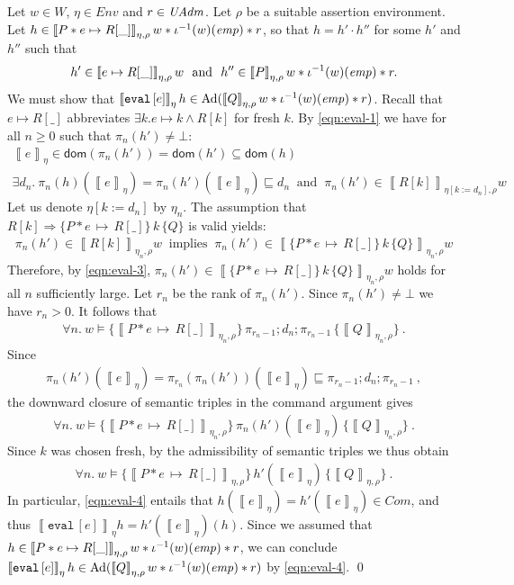 \documentclass{LMCS}
\theoremstyle{remark}
\newcommand{\Com}{\ensuremath{\mathit{Com}}\xspace}
\newcommand{\UNQUOTE}[1]{\SYN{eval}\,{#1}}
\newcommand{\SYN}[1]{\ensuremath{\texttt{#1}}}
\newcommand{\dom}[1]{\ensuremath{\mathsf{dom}({#1})}}
\newcommand{\COMB}{\ensuremath{\cdot}}
\newcommand{\Env}{\ensuremath{\textit{Env}}\xspace}
\newcommand{\triple}[3]{{\ensuremath{\!\left.\{ #1 \}\, #2\, \{  #3 \}\!\right.}}}
\newcommand{\pointsto}{\ensuremath{\mapsto}}
\newcommand{\wemp}{\textnormal{\textit{emp}}}
\newcommand{\den}[1]{\left\llbracket #1
  \right\rrbracket}
\newcommand{\W}{\ensuremath{W}}
\newcommand{\UNFOLD}{\ensuremath{\iota^{-1}}}
\begin{document}
\proof
Let $w\in\W$, $\eta\in\Env$ and $r\in\mathit{UAdm}$. Let $\rho$ be a suitable assertion environment. 
Let $h\in\den{P*e\pointsto R[\_]}_{\eta,\rho} w *\UNFOLD(w)(\wemp) *r$, so that 
$h = h'\COMB h''$ for some $h'$ and $h''$ such that 
\begin{align}
\label{eqn:eval-1}
h'\in\den{e\pointsto R[\_]}_{\eta,\rho} w\ \text{ and }\ h''\in\den{P}_{\eta,\rho} w*\UNFOLD(w)(\wemp) *r . 
\end{align}
We must show that $\den{\UNQUOTE{[e]}}_\eta h\in \DCl(\den{Q}_{\eta,\rho} w*\UNFOLD(w)(\wemp) *r)$. 
Recall that $e\pointsto R[\_]$ abbreviates $\exists k. e\pointsto k \wedge R[k]$ for fresh $k$. 
By \eqref{eqn:eval-1} we have for all $n\geq 0$ such that $\pi_n(h')\neq\bot$:
\begin{gather}
\label{eqn:eval-2}
\den{e}_\eta\in\dom{\pi_n(h')} = \dom{h'} \subseteq\dom{h}\\
\label{eqn:eval-3}
\exists d_n.\  \pi_n(h)(\den{e}_\eta) = \pi_n(h')(\den{e}_\eta) \sqsubseteq d_n\ \text{ and }\ \pi_n(h')\in\den{R[k]}_{\eta[k:=d_n],\rho} w
\end{gather}
Let us denote $\eta[k:=d_n]$ by $\eta_n$. The assumption that $R[k] \Rightarrow \triple{P*e\,{\pointsto}\,R[\_]}{k}{Q}$ is  valid yields:
\begin{align*}
\pi_n(h')\in \den{R[k]}_{\eta_n,\rho}w\ \text{ implies }\ \pi_n(h')\in\den{\triple{P*e\,{\pointsto}\,R[\_]}{k}{Q}}_{\eta_n,\rho}w
\end{align*}
Therefore, by \eqref{eqn:eval-3}, $\pi_n(h')\in\den{\triple{P*e\,{\pointsto}\,R[\_]}{k}{Q}}_{\eta_n,\rho}w$ holds for all $n$ sufficiently large. 
Let $r_n$ be the rank of $\pi_n(h')$. Since $\pi_n(h')\neq\bot$ we have $r_n>0$. 
It follows that 
\begin{align*}
\forall n.\ w\models\triple{\den{P*e\,{\pointsto}\,R[\_]}_{\eta_n,\rho}}{\pi_{r_n-1};d_n;\pi_{r_n-1}}{\den{Q}_{\eta_n,\rho}}\ .
\end{align*}
Since  
\begin{align}
\label{eqn:eval-key-equation}
\pi_n(h')(\den{e}_\eta)= \pi_{r_n}(\pi_n(h'))(\den{e}_\eta) \sqsubseteq \pi_{r_n-1};d_n;\pi_{r_n-1}\ , 
\end{align}
the downward closure  of semantic triples  in the command argument gives
\begin{align*}
\forall n.\ w\models\triple{\den{P*e\,{\pointsto}\,R[\_]}_{\eta_n,\rho}}{\pi_n(h')(\den{e}_\eta)}{\den{Q}_{\eta_n,\rho}}\ .
\end{align*}
Since $k$ was chosen fresh,   by the admissibility of semantic triples  we thus obtain 
\begin{align}
\label{eqn:eval-4}
\forall n.\ w\models\triple{\den{P*e\,{\pointsto}\,R[\_]}_{\eta,\rho}}{h'(\den{e}_\eta)}{\den{Q}_{\eta,\rho}}\ .
\end{align}
In particular, \eqref{eqn:eval-4} entails that $h(\den{e}_\eta) = h'(\den{e}_\eta)\in\Com$, and thus  $\den{\UNQUOTE{[e]}}_\eta h = h'(\den{e}_\eta)(h)$. 
Since we assumed that 
$h\in\den{P*e\pointsto R[\_]}_{\eta,\rho} w *\UNFOLD(w)(\wemp) *r$, 
we can conclude  
$\den{\UNQUOTE{[e]}}_\eta h\in\DCl(\den{Q}_{\eta,\rho} w *\UNFOLD(w)(\wemp) *r)$ 
by \eqref{eqn:eval-4}. \qed
\end{document}
